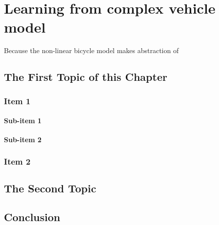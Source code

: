 \chapter{Learning from complex vehicle model}
\label{cha:Tracking_MPC}


Because the non-linear bicycle model makes abstraction of 



\section{The First Topic of this Chapter}
\subsection{Item 1}
\subsubsection{Sub-item 1}


\subsubsection{Sub-item 2}


\subsection{Item 2}


\section{The Second Topic}


\section{Conclusion}

